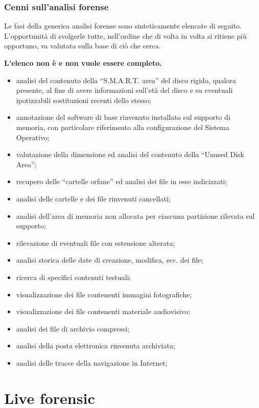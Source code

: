 \documentclass[11pt]{beamer}
\begin{document}
	\begin{frame}[allowframebreaks]
		\frametitle{Cenni sull'analisi forense}
		Le fasi della generica analisi forense sono sinteticamente elencate di seguito. L'opportunità di svolgerle tutte, nell'ordine che di volta in volta si ritiene più opportuno, va valutata sulla base di ciò che cerca. 

		\textbf{L'elenco non è e non vuole essere completo.}
		
		
		\begin{itemize}
			\item analisi del contenuto della ``S.M.A.R.T. area''  del disco rigido, qualora presente, al fine di avere informazioni sull'età del disco e su eventuali ipotizzabili sostituzioni recenti dello stesso;
			\item annotazione del software di base rinvenuto installato sul supporto di memoria, con particolare riferimento alla configurazione del Sistema Operativo;
			\item valutazione della dimensione ed analisi del contenuto della ``Unused Disk Area'';
			\item recupero delle ``cartelle orfane'' ed analisi dei file in esse indicizzati;
			\item analisi delle cartelle e dei file rinvenuti cancellati;
			\item analisi dell'area di memoria non allocata per ciascuna partizione rilevata sul supporto;
			\item rilevazione di eventuali file con estensione alterata;
			\item analisi storica delle date di creazione, modifica, ecc. dei file;
			\item ricerca di specifici contenuti testuali;
			\item visualizzazione dei file contenenti immagini fotografiche;
			\item visualizzazione dei file contenenti materiale audiovisivo;
			\item analisi dei file di archivio compressi;
			\item analisi della posta elettronica rinvenuta archiviata;
			\item analisi delle tracce della navigazione in Internet;
			
		\end{itemize}
	\end{frame}
	
	\section{Live forensic}
	
\end{document}
